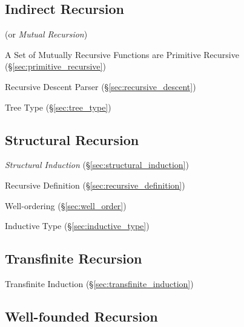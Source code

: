 \subsection{Indirect Recursion}\label{sec:indirect_recursion}

(or \emph{Mutual Recursion})

A Set of Mutually Recursive Functions are Primitive Recursive
(\S\ref{sec:primitive_recursive})

Recursive Descent Parser (\S\ref{sec:recursive_descent})

Tree Type (\S\ref{sec:tree_type})



\subsection{Structural Recursion}\label{sec:structural_recursion}

\emph{Structural Induction} (\S\ref{sec:structural_induction})

Recursive Definition (\S\ref{sec:recursive_definition})

Well-ordering (\S\ref{sec:well_order})

Inductive Type (\S\ref{sec:inductive_type})



\subsection{Transfinite Recursion}\label{sec:transfinite_recursion}

Transfinite Induction (\S\ref{sec:transfinite_induction})



\subsection{Well-founded Recursion}\label{sec:wellfounded_recursion}

